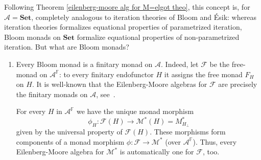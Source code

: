 \documentclass{LMCS}
\theoremstyle{plain}
\theoremstyle{definition}
\numberwithin{equation}{section}
\begin{document}
\begin{rem}
Following Theorem \ref{eilenberg-moore alg for M=elgot theo}, this concept is, for $\mathcal A=\mathbf{Set}$, completely analogous to iteration theories of Bloom and \'Esik: whereas iteration theories formalizes equational properties of parametrized iteration, Bloom monads on $\mathbf{Set}$ formalize equational properties of non-parametrized iteration. But what are Bloom monads?

\begin{enumerate}
\item Every Bloom monad is a finitary monad on $\mathcal A$. Indeed, let
$\mathcal F$ be the free-monad on $\mathcal A^\mathbb{F}$: to every
finitary endofunctor $H$ it assigns the free monad $F_H$ on $H$. It is
well-known that the Eilenberg-Moore algebras for $\mathcal F$ are
precisely the finitary monads on $\mathcal A$,
see~\cite{lack}.

For every $H$ in $\mathcal A^\mathbb F$ we have the unique monad morphism $$\phi_H:\mathcal F(H)\to \mathcal M^*(H)=M^*_{H_\bot}$$ given by the universal property of $\mathcal F(H)$. These morphisms form components of a monad morphism $\phi:\mathcal F\to \mathcal M^*$ (over $\mathcal A^\mathbb F$). Thus, every Eilenberg-Moore algebra for $\mathcal M^*$ is automatically one for $\mathcal F$, too.


\end{enumerate}
\end{rem}
\end{document}
